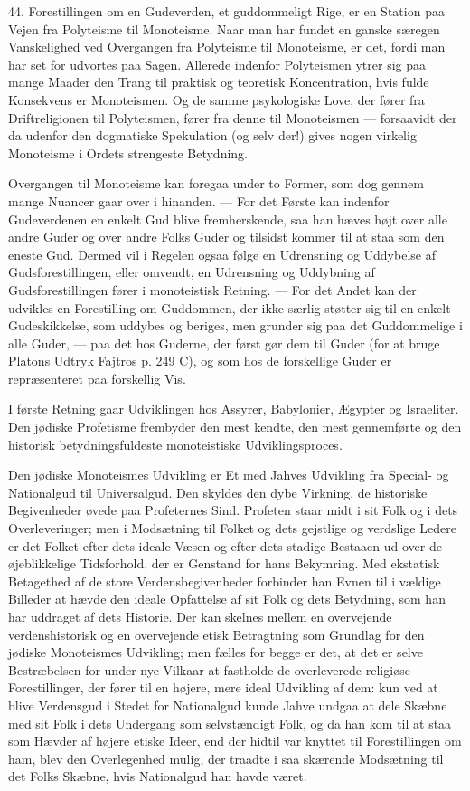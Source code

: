 \documentclass[12pt,a4paper,openany]{book}
\newcommand{\opage}[1]{\marginnote{\footnotesize\textit{[#1]}}}
\begin{document}
44. Forestillingen om en Gudeverden, et guddommeligt Rige, er en Station
paa Vejen fra Polyteisme til Monoteisme. Naar man har fundet en ganske
særegen Vanskelighed ved Overgangen fra Polyteisme til Monoteisme, er
det, fordi man har set for udvortes paa Sagen. Allerede indenfor
Polyteismen ytrer sig paa mange Maader den Trang til praktisk og
teoretisk Koncentration, hvis fulde Konsekvens er Monoteismen. Og de
samme psykologiske Love, der fører fra Driftreligionen til Polyteismen,
fører fra denne til Monoteismen --- forsaavidt der da udenfor den
dogmatiske Spekulation (og selv der!) gives nogen virkelig Monoteisme i
Ordets strengeste Betydning.

Overgangen til Monoteisme kan foregaa under to Former,
\opage{102}som dog gennem mange Nuancer gaar over i hinanden. --- For
det Første kan indenfor Gudeverdenen en enkelt Gud blive fremherskende,
saa han hæves højt over alle andre Guder og over andre Folks Guder og
tilsidst kommer til at staa som den eneste Gud. Dermed vil i Regelen
ogsaa følge en Udrensning og Uddybelse af Gudsforestillingen, eller
omvendt, en Udrensning og Uddybning af Gudsforestillingen fører i
monoteistisk Retning. --- For det Andet kan der udvikles en Forestilling
om Guddommen, der ikke særlig støtter sig til en enkelt Gudeskikkelse,
som uddybes og beriges, men grunder sig paa det Guddommelige i alle
Guder, --- paa det hos Guderne, der først gør dem til Guder (for at
bruge Platons Udtryk Fajtros p. 249 C), og som hos de forskellige Guder
er repræsenteret paa forskellig Vis.

I første Retning gaar Udviklingen hos Assyrer, Babylonier, Ægypter og
Israeliter. Den jødiske Profetisme frembyder den mest kendte, den mest
gennemførte og den historisk betydningsfuldeste monoteistiske
Udviklingsproces.

Den jødiske Monoteismes Udvikling er Et med Jahves Udvikling fra
Special- og Nationalgud til Universalgud. Den skyldes den dybe Virkning,
de historiske Begivenheder øvede paa Profeternes Sind. Profeten staar
midt i sit Folk og i dets Overleveringer; men i Modsætning til Folket og
dets gejstlige og verdslige Ledere er det Folket efter dets ideale Væsen
og efter dets stadige Bestaaen ud over de øjeblikkelige Tidsforhold, der
er Genstand for hans Bekymring. Med ekstatisk Betagethed af de store
Verdensbegivenheder forbinder han Evnen til i vældige Billeder at hævde
den ideale Opfattelse af sit Folk og dets Betydning, som han har
uddraget af dets Historie. Der kan skelnes mellem en overvejende
verdenshistorisk og en overvejende etisk Betragtning som Grundlag for
den jødiske Monoteismes Udvikling; men fælles for begge er det, at det
er selve Bestræbelsen for under nye Vilkaar at fastholde de overleverede
religiøse Forestillinger, der fører til en højere, mere ideal Udvikling
af dem: kun ved at blive Verdensgud i Stedet for Nationalgud kunde Jahve
undgaa at dele Skæbne med sit Folk i dets Undergang som selvstændigt
Folk, og da han kom til at staa som Hævder af højere etiske Ideer, end
der hidtil var knyttet til Forestillingen om ham, blev den Overlegenhed
mulig, der traadte i saa skærende Modsætning til det Folks Skæbne, hvis
Nationalgud han havde været.
\end{document}
